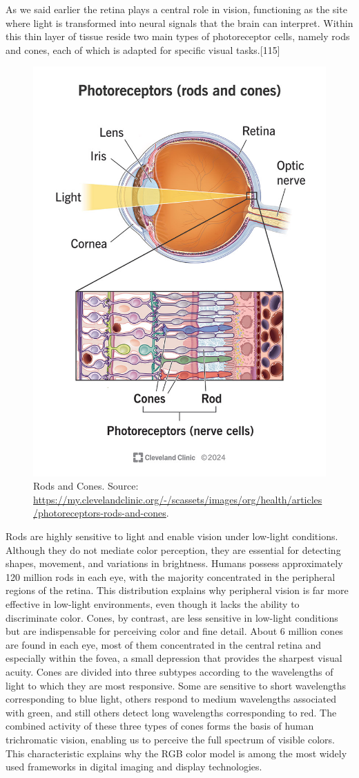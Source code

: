 \documentclass[12pt]{report}
\begin{document}
As we said earlier the retina plays a central role in vision, functioning as the site where light is transformed into neural signals that the brain can interpret. 
Within this thin layer of tissue reside two main types of photoreceptor cells, namely rods and cones, each of which is adapted for specific visual tasks.[115]

\begin{figure}[ht]
    \centering
    \includegraphics[width = 0.6
    \textwidth]{Images/Theory/rods_cones.jpg}
    \caption{Rods and Cones. Source: \url{https://my.clevelandclinic.org/-/scassets/images/org/health/articles/photoreceptors-rods-and-cones}.}
    \label{fig:rodscones}
\end{figure}

Rods are highly sensitive to light and enable vision under low-light conditions. 
Although they do not mediate color perception, they are essential for detecting shapes, movement, and variations in brightness. 
Humans possess approximately 120 million rods in each eye, with the majority concentrated in the peripheral regions of the retina. 
This distribution explains why peripheral vision is far more effective in low-light environments, even though it lacks the ability to discriminate color.
Cones, by contrast, are less sensitive in low-light conditions but are indispensable for perceiving color and fine detail.
About 6 million cones are found in each eye, most of them concentrated in the central retina and especially within the fovea, a small depression that provides the sharpest visual acuity.
Cones are divided into three subtypes according to the wavelengths of light to which they are most responsive.
Some are sensitive to short wavelengths corresponding to blue light, others respond to medium wavelengths associated with green, and still others detect long wavelengths corresponding to red. 
The combined activity of these three types of cones forms the basis of human trichromatic vision, enabling us to perceive the full spectrum of visible colors.
This characteristic explains why the RGB color model is among the most widely used frameworks in digital imaging and display technologies.
\end{document}
